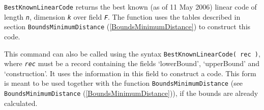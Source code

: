 \documentclass[a4paper,11pt]{report}
\begin{document}
{{{  \texttt{BestKnownLinearCode} returns the best known (as of 11 May 2006) linear code of length \mbox{\texttt{\slshape n}}, dimension \mbox{\texttt{\slshape k}} over field \mbox{\texttt{\slshape F}}. The function uses the tables described in section \texttt{BoundsMinimumDistance} (\ref{BoundsMinimumDistance}) to construct this code. 

 This command can also be called using the syntax \texttt{BestKnownLinearCode( rec )}, where \mbox{\texttt{\slshape rec}} must be a record containing the fields `lowerBound', `upperBound' and
`construction'. It uses the information in this field to construct a code.
This form is meant to be used together with the function \texttt{BoundsMinimumDistance} (see \texttt{BoundsMinimumDistance} (\ref{BoundsMinimumDistance})), if the bounds are already calculated. }

}}
\end{document}
